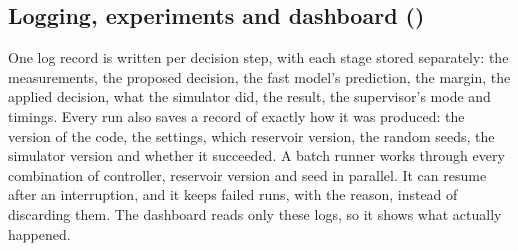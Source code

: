 \documentclass[11pt,letterpaper]{article}
\begin{document}
\subsection{Logging, experiments and dashboard (\MahdiS)}

One log record is written per decision step, with each stage stored separately: the
measurements, the proposed decision, the fast model's prediction, the margin, the applied
decision, what the simulator did, the result, the supervisor's mode and timings. Every run
also saves a record of exactly how it was produced: the version of the code, the settings,
which reservoir version, the random seeds, the simulator version and whether it succeeded.
A batch runner works through every combination of controller, reservoir version and seed in
parallel. It can resume after an interruption, and it keeps failed runs, with the reason,
instead of discarding them. The dashboard reads only these logs, so it shows what actually
happened.


\end{document}
